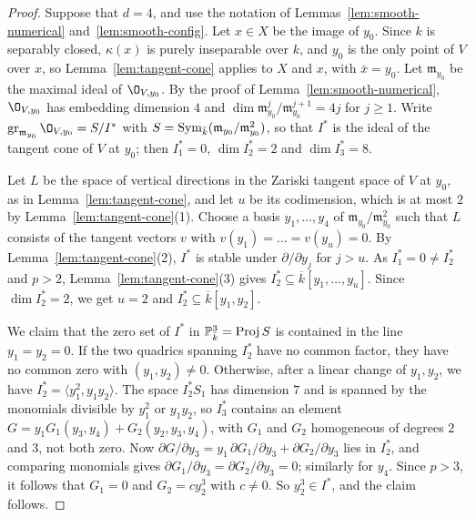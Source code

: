 \begin{proof}
Suppose that $d = 4$, and use the notation of Lemmas~\ref{lem:smooth-numerical} and~\ref{lem:smooth-config}.
Let $x\in X$ be the image of $y_0$.
Since $k$ is separably closed, $\kappa(x)$ is purely inseparable over $k$, and $y_0$ is the only point of $V$ over $x$, so Lemma~\ref{lem:tangent-cone} applies to $X$ and $x$, with $\bar x = y_0$.
Let $\mathfrak m_{y_0}$ be the maximal ideal of $\O_{V,y_0}$.
By the proof of Lemma~\ref{lem:smooth-numerical}, $\O_{V,y_0}$ has embedding dimension $4$ and $\dim\mathfrak m_{y_0}^j/\mathfrak m_{y_0}^{j+1} = 4j$ for $j\geq 1$.
Write $\operatorname{gr}_{\mathfrak m_{y_0}}\O_{V,y_0} = S/I^*$ with $S = \operatorname{Sym}_{\bar k}(\mathfrak m_{y_0}/\mathfrak m_{y_0}^2)$, so that $I^*$ is the ideal of the tangent cone of $V$ at $y_0$; then $I^*_1 = 0$, $\dim I^*_2 = 2$ and $\dim I^*_3 = 8$.

Let $L$ be the space of vertical directions in the Zariski tangent space of $V$ at $y_0$, as in Lemma~\ref{lem:tangent-cone}, and let $u$ be its codimension, which is at most $2$ by Lemma~\ref{lem:tangent-cone}(1).
Choose a basis $y_1,\dots,y_4$ of $\mathfrak m_{y_0}/\mathfrak m_{y_0}^2$ such that $L$ consists of the tangent vectors $v$ with $v(y_1) = \dots = v(y_u) = 0$.
By Lemma~\ref{lem:tangent-cone}(2), $I^*$ is stable under $\partial/\partial y_j$ for $j>u$.
As $I^*_1 = 0\neq I^*_2$ and $p>2$, Lemma~\ref{lem:tangent-cone}(3) gives $I^*_2\subseteq\overline k[y_1,\dots,y_u]$.
Since $\dim I^*_2 = 2$, we get $u = 2$ and $I^*_2\subseteq\overline k[y_1,y_2]$.

We claim that the zero set of $I^*$ in $\mathbb{P}^3_{\bar k} = \operatorname{Proj} S$ is contained in the line $y_1 = y_2 = 0$.
If the two quadrics spanning $I^*_2$ have no common factor, they have no common zero with $(y_1,y_2)\neq 0$.
Otherwise, after a linear change of $y_1,y_2$, we have $I^*_2 = \langle y_1^2,y_1y_2\rangle$.
The space $I^*_2S_1$ has dimension $7$ and is spanned by the monomials divisible by $y_1^2$ or $y_1y_2$, so $I^*_3$ contains an element $G = y_1G_1(y_3,y_4)+G_2(y_2,y_3,y_4)$, with $G_1$ and $G_2$ homogeneous of degrees $2$ and $3$, not both zero.
Now $\partial G/\partial y_3 = y_1\,\partial G_1/\partial y_3+\partial G_2/\partial y_3$ lies in $I^*_2$, and comparing monomials gives $\partial G_1/\partial y_3 = \partial G_2/\partial y_3 = 0$; similarly for $y_4$.
Since $p>3$, it follows that $G_1 = 0$ and $G_2 = cy_2^3$ with $c\neq 0$.
So $y_2^3\in I^*$, and the claim follows.


\end{proof}
